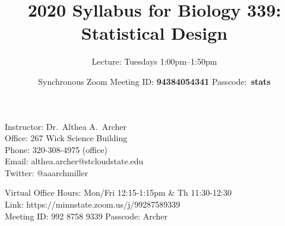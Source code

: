 \documentclass{tufte-handout}
\title{2020 Syllabus for Biology 339: Statistical Design}										%
\author{Lecture: Tuesdays 1:00pm--1:50pm }										%
\date{Synchronous Zoom Meeting ID: \textbf{94384054341}
Passcode:~\textbf{stats}}
\begin{document}
\maketitle

Instructor: Dr.~Althea A.~Archer\\
Office: 267 Wick Science Building\\
Phone: 320-308-4975 (office) \\ %
Email: althea.archer@stcloudstate.edu\\
Twitter: @aaarchmiller

Virtual Office Hours: Mon/Fri 12:15-1:15pm \& Th 11:30-12:30\\
Link: https://minnstate.zoom.us/j/99287589339\\
Meeting ID: 992 8758 9339 Passcode: Archer
\end{document}
